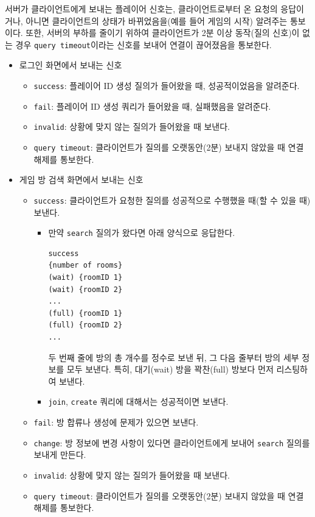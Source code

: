 \documentclass[a4paper, 10pt]{article}
\begin{document}
서버가 클라이언트에게 보내는 플레이어 신호는, 클라이언트로부터 온 요청의 응답이거나,
아니면 클라이언트의 상태가 바뀌었음을(예를 들어 게임의 시작) 알려주는 통보이다.
또한, 서버의 부하를 줄이기 위하여 클라이언트가 2분 이상 동작(질의 신호)이 없는 경우
\texttt{query timeout}이라는 신호를 보내어 연결이 끊어졌음을 통보한다.
\begin{itemize}
  \item 로그인 화면에서 보내는 신호
  \begin{itemize}
    \item \texttt{success}: 플레이어 ID 생성 질의가 들어왔을 때, 성공적이었음을 알려준다.
    \item \texttt{fail}: 플레이어 ID 생성 쿼리가 들어왔을 때, 실패했음을 알려준다.
    \item \texttt{invalid}: 상황에 맞지 않는 질의가 들어왔을 때 보낸다.
    \item \texttt{query timeout}: 클라이언트가 질의를 오랫동안(2분) 보내지 않았을 때 연결 해제를 통보한다.
  \end{itemize}
  \item 게임 방 검색 화면에서 보내는 신호
  \begin{itemize}
    \item \texttt{success}: 클라이언트가 요청한 질의를 성공적으로 수행했을 때(할 수 있을 때) 보낸다.
    \begin{itemize}
      \item 만약 \texttt{search} 질의가 왔다면 아래 양식으로 응답한다.
        \begin{Verbatim}[tabsize=4,xleftmargin=2em]
success
{number of rooms}
(wait) {roomID 1}
(wait) {roomID 2}
...
(full) {roomID 1}
(full) {roomID 2}
...
        \end{Verbatim}
        두 번째 줄에 방의 총 개수를 정수로 보낸 뒤, 그 다음 줄부터 방의 세부 정보를 모두 보낸다.
        특히, 대기(wait) 방을 꽉찬(full) 방보다 먼저 리스팅하여 보낸다.
      \item \texttt{join}, \texttt{create} 쿼리에 대해서는 성공적이면 보낸다.
    \end{itemize}
    \item \texttt{fail}: 방 합류나 생성에 문제가 있으면 보낸다.
    \item \texttt{change}: 방 정보에 변경 사항이 있다면 클라이언트에게 보내어 \texttt{search} 질의를 보내게 만든다.
    \item \texttt{invalid}: 상황에 맞지 않는 질의가 들어왔을 때 보낸다.
    \item \texttt{query timeout}: 클라이언트가 질의를 오랫동안(2분) 보내지 않았을 때 연결 해제를 통보한다.

\end{itemize}
\end{itemize}
\end{document}
